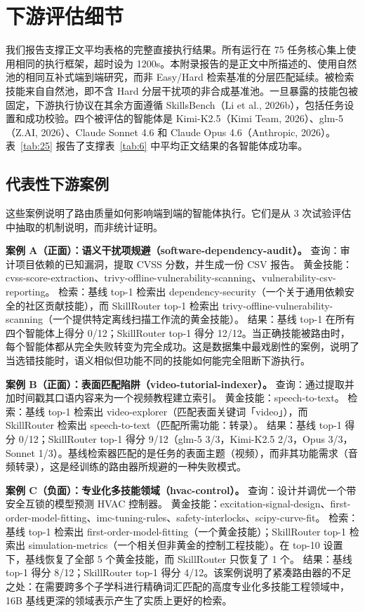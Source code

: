 \documentclass[11pt,UTF8,fontset=fandol]{ctexart}
\begin{document}
\section{下游评估细节}

我们报告支撑正文平均表格的完整直接执行结果。所有运行在 75 任务核心集上使用相同的执行框架，超时设为 1200s。本附录报告的是正文中所描述的、使用自然池的相同互补式端到端研究，而非 Easy/Hard 检索基准的分层匹配延续。被检索技能来自自然池，即不含 Hard 分层干扰项的非合成基准池。一旦暴露的技能包被固定，下游执行协议在其余方面遵循 SkillsBench（Li et al., 2026b），包括任务设置和成功校验。四个被评估的智能体是 Kimi-K2.5（Kimi Team, 2026）、glm-5（Z.AI, 2026）、Claude Sonnet 4.6 和 Claude Opus 4.6（Anthropic, 2026）。表~\ref{tab:25} 报告了支撑表~\ref{tab:6} 中平均正文结果的各智能体成功率。

\subsection{代表性下游案例}

这些案例说明了路由质量如何影响端到端的智能体执行。它们是从 3 次试验评估中抽取的机制说明，而非统计证明。

\textbf{案例 A（正面）：语义干扰项规避（software-dependency-audit）。} 查询：审计项目依赖的已知漏洞，提取 CVSS 分数，并生成一份 CSV 报告。
黄金技能：cvss-score-extraction、trivy-offline-vulnerability-scanning、vulnerability-csv-reporting。
检索：基线 top-1 检索出 dependency-security（一个关于通用依赖安全的社区贡献技能），而 SkillRouter top-1 检索出 trivy-offline-vulnerability-scanning（一个提供特定离线扫描工作流的黄金技能）。
结果：基线 top-1 在所有四个智能体上得分 0/12；SkillRouter top-1 得分 12/12。当正确技能被路由时，每个智能体都从完全失败转变为完全成功。这是数据集中最戏剧性的案例，说明了当选错技能时，语义相似但功能不同的技能如何能完全阻断下游执行。

\textbf{案例 B（正面）：表面匹配陷阱（video-tutorial-indexer）。} 查询：通过提取并加时间戳其口语内容来为一个视频教程建立索引。
黄金技能：speech-to-text。
检索：基线 top-1 检索出 video-explorer（匹配表面关键词「video」），而 SkillRouter 检索出 speech-to-text（匹配所需功能：转录）。
结果：基线 top-1 得分 0/12；SkillRouter top-1 得分 9/12（glm-5 3/3，Kimi-K2.5 2/3，Opus 3/3，Sonnet 1/3）。基线检索器匹配的是任务的表面主题（视频），而非其功能需求（音频转录），这是经训练的路由器所规避的一种失败模式。

\textbf{案例 C（负面）：专业化多技能领域（hvac-control）。} 查询：设计并调优一个带安全互锁的模型预测 HVAC 控制器。
黄金技能：excitation-signal-design、first-order-model-fitting、imc-tuning-rules、safety-interlocks、scipy-curve-fit。
检索：基线 top-1 检索出 first-order-model-fitting（一个黄金技能）；SkillRouter top-1 检索出 simulation-metrics（一个相关但非黄金的控制工程技能）。在 top-10 设置下，基线恢复了全部 5 个黄金技能，而 SkillRouter 只恢复了 1 个。
结果：基线 top-1 得分 8/12；SkillRouter top-1 得分 4/12。该案例说明了紧凑路由器的不足之处：在需要跨多个子学科进行精确词汇匹配的高度专业化多技能工程领域中，16B 基线更深的领域表示产生了实质上更好的检索。
\end{document}
